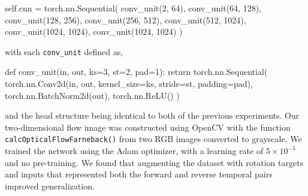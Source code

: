 \begin{python}
self.cnn = torch.nn.Sequential(
    conv_unit(2, 64),
    conv_unit(64, 128),
    conv_unit(128, 256),
    conv_unit(256, 512),
    conv_unit(512, 1024),
    conv_unit(1024, 1024),
    conv_unit(1024, 1024)
)
\end{python}
with each \texttt{conv\_unit} defined as,
\begin{python}
def conv_unit(in, out, ks=3, st=2, pad=1):
        return torch.nn.Sequential(
            torch.nn.Conv2d(in, out, 
            	kernel_size=ks, 
            	stride=st, 
            	padding=pad),
            torch.nn.BatchNorm2d(out),
            torch.nn.ReLU()
        )	
\end{python}
and the head structure being identical to both of the previous experiments. Our two-dimensional flow image was constructed using OpenCV with the function \texttt{calcOpticalFlowFarneback()} from two RGB images converted to grayscale. We trained the network using the Adam optimizer, with a learning rate of $5 \times 10^{-5}$ and no pre-training. We found that augmenting the dataset with rotation targets and inputs that represented both the forward and reverse temporal pairs improved generalization. 
%
%
%


